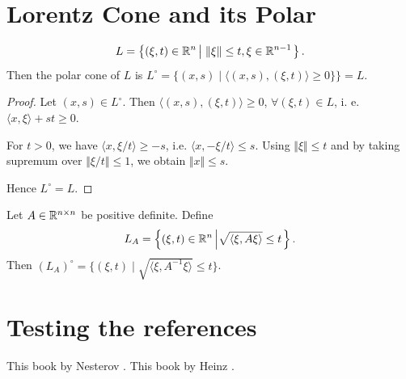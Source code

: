 \documentclass[12pt]{article}
\begin{document}
\section{Lorentz Cone and its Polar}
    \begin{example}
        \begin{equation}
            L = \left\lbrace
            (\xi, t) \in \mathbb R^n \left| \;
                \Vert \xi\Vert \le t, \xi \in \mathbb R^{n - 1}
            \right.
            \right\rbrace.
        \end{equation}
        Then the polar cone of $L$ is $L^\circ = \{(x, s) \;|\; \langle (x, s), (\xi, t)\rangle \ge 0\}\} = L$.
    \end{example}
    \begin{proof}
        \par
        Let $(x, s) \in L^\circ$. Then $\langle (x, s), (\xi, t)\rangle \ge 0$, $\forall (\xi, t) \in L$, i. e. $\langle x, \xi\rangle + st \ge 0$.
        \par
        For $t > 0$, we have $\langle x, \xi/t\rangle \ge -s$, i.e. $\langle x, - \xi/t\rangle \le s$. Using $\Vert \xi\Vert \le t$ and by taking supremum over $\Vert \xi/t\Vert\le 1$, we obtain  $\Vert x\Vert \le s$.
        \par
        Hence $L^\circ = L$.
    \end{proof}
    \begin{corollary}
        Let $A \in \mathbb R^{n\times n}$ be positive definite. Define
        $$
            L_A =
            \left\lbrace
                (\xi, t)\in \mathbb R^n \left|
                    \sqrt{\langle \xi, A\xi\rangle} \le t
                \right.
            \right\rbrace.
        $$
        Then $(L_A)^\circ = \{ (\xi, t) \;|\; \sqrt{\langle \xi, A^{-1}\xi\rangle}\le t\}$.
    \end{corollary}

\section{Testing the references}
    This book by Nesterov \cite{nesterov_lectures_2018}. 
    This book by Heinz \cite{bauschke_convex_2017}. 
\end{document}
